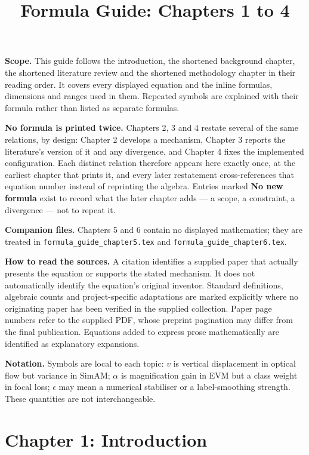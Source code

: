 \documentclass[11pt,a4paper]{article}
\title{Formula Guide: Chapters 1 to 4}
\author{}
\date{}
\numberwithin{equation}{section}
\begin{document}
\maketitle

\textbf{Scope.} This guide follows the introduction, the shortened background
chapter, the shortened literature review and the shortened methodology chapter
in their reading order. It covers every displayed equation and the inline
formulas, dimensions and ranges used in them. Repeated symbols are explained
with their formula rather than listed as separate formulas.

\textbf{No formula is printed twice.} Chapters 2, 3 and 4 restate several of
the same relations, by design: Chapter 2 develops a mechanism, Chapter 3
reports the literature's version of it and any divergence, and Chapter 4 fixes
the implemented configuration. Each distinct relation therefore appears here
exactly once, at the earliest chapter that prints it, and every later
restatement cross-references that equation number instead of reprinting the
algebra. Entries marked \textbf{No new formula} exist to record what the later
chapter adds --- a scope, a constraint, a divergence --- not to repeat it.

\textbf{Companion files.} Chapters 5 and 6 contain no displayed mathematics;
they are treated in \texttt{formula\_guide\_chapter5.tex} and
\texttt{formula\_guide\_chapter6.tex}.

\textbf{How to read the sources.} A citation identifies a supplied paper that
actually presents the equation or supports the stated mechanism. It does not
automatically identify the equation's original inventor. Standard definitions,
algebraic counts and project-specific adaptations are marked explicitly where
no originating paper has been verified in the supplied collection. Paper page
numbers refer to the supplied PDF, whose preprint pagination may differ from
the final publication. Equations added to express prose mathematically are
identified as explanatory expansions.

\textbf{Notation.} Symbols are local to each topic: $v$ is vertical displacement
in optical flow but variance in SimAM; $\alpha$ is magnification gain in EVM but
a class weight in focal loss; $\epsilon$ may mean a numerical stabiliser or a
label-smoothing strength. These quantities are not interchangeable.

\tableofcontents
\clearpage

\section{Chapter 1: Introduction}
\label{fg:chapter1}
\end{document}
